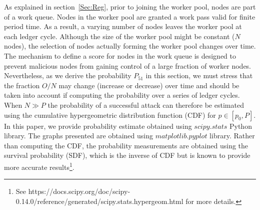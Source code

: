 As explained in section~\ref{Sec:Reg}, prior to joining the worker pool, nodes are part of a work queue. Nodes in the worker pool are granted a work pass valid for finite period time. As a result, a varying number of nodes leaves the worker pool at each ledger cycle. Although the size of the worker pool might be constant ($N$ nodes), the selection of nodes actually forming the worker pool changes over time. The mechanism to define a score for nodes in the work queue is designed to prevent malicious nodes from gaining control of a large fraction of worker nodes. Nevertheless, as we derive the probability $P_{51}$ in this section, we must stress that the fraction $O/N$ may change (increase or decrease) over time and should be taken into account if computing the probability over a series of ledger cycles.\\

When $N \gg P$ the probability of a successful attack can therefore be estimated using the cumulative hypergeometric distribution function (CDF) for $p \in [p_0,P]$. In this paper, we provide probability estimate obtained using $scipy.stats$ Python library. The graphs presented are obtained using $matplotlib.pyplot$ library. Rather than computing the CDF, the probability measurements are obtained using the survival probability (SDF), which is the inverse of CDF but is known to provide more accurate results\footnote{See https://docs.scipy.org/doc/scipy-0.14.0/reference/generated/scipy.stats.hypergeom.html for more details.}. \\

